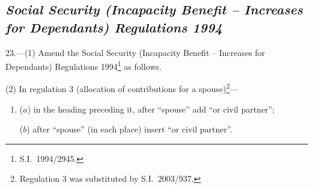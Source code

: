 \documentclass[12pt,a4paper]{article}
\begin{document}
%
%
%
%
%
%
%

\subsection*{\itshape Social Security (Incapacity Benefit – Increases for Dependants) Regulations 1994}

23.---(1)  Amend the Social Security (Incapacity Benefit – Increases for Dependants) Regulations 1994\footnote{S.I.\ 1994/2945.} as follows.

(2) In regulation 3 (allocation of contributions for a spouse)\footnote{Regulation 3 was substituted by S.I.\ 2003/937.}—
\begin{enumerate}\item[]
($a$) in the heading preceding it, after “spouse” add “or civil partner”;

($b$) after “spouse” (in each place) insert “or civil partner”.
\end{enumerate}
\end{document}
